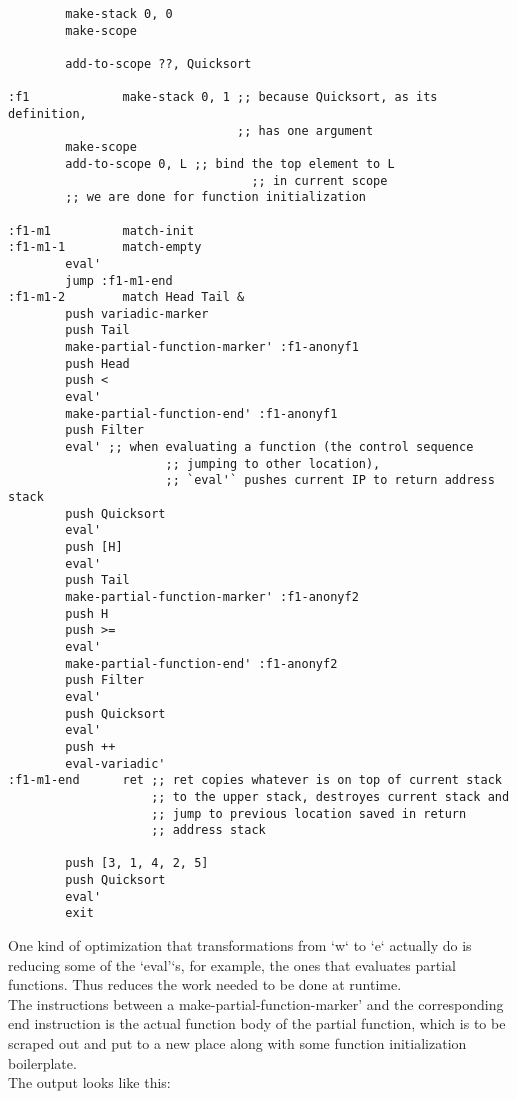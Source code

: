 \documentclass{article}
\begin{document}
\begin{Verbatim}
		make-stack 0, 0
		make-scope

		add-to-scope ??, Quicksort

:f1             make-stack 0, 1 ;; because Quicksort, as its definition,
                                ;; has one argument
		make-scope
		add-to-scope 0, L ;; bind the top element to L
                                  ;; in current scope
		;; we are done for function initialization

:f1-m1          match-init
:f1-m1-1        match-empty
		eval'
		jump :f1-m1-end
:f1-m1-2        match Head Tail &
		push variadic-marker
		push Tail
		make-partial-function-marker' :f1-anonyf1
		push Head
		push <
		eval'
		make-partial-function-end' :f1-anonyf1
		push Filter
		eval' ;; when evaluating a function (the control sequence
                      ;; jumping to other location),
                      ;; `eval'` pushes current IP to return address stack
		push Quicksort
		eval'
		push [H]
		eval'
		push Tail
		make-partial-function-marker' :f1-anonyf2
		push H
		push >=
		eval'
		make-partial-function-end' :f1-anonyf2
		push Filter
		eval'
		push Quicksort
		eval'
		push ++
		eval-variadic'
:f1-m1-end      ret ;; ret copies whatever is on top of current stack
                    ;; to the upper stack, destroyes current stack and
                    ;; jump to previous location saved in return
                    ;; address stack

		push [3, 1, 4, 2, 5]
		push Quicksort
		eval'
		exit
\end{Verbatim}

One kind of optimization that transformations from `w` to `e` actually do is reducing some of the `eval'`s, for example, the ones that evaluates partial functions. Thus reduces the work needed to be done at runtime.\\

The instructions between a make-partial-function-marker' and the corresponding end instruction is the actual function body of the partial function, which is to be scraped out and put to a new place along with some function initialization boilerplate.\\

The output looks like this:
\end{document}
